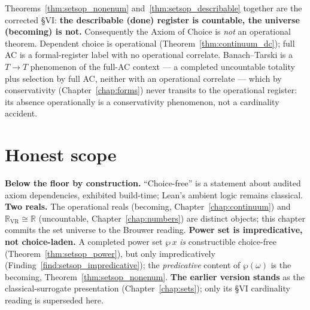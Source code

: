 Theorems~\ref{thm:setsop_nonenum} and~\ref{thm:setsop_describable} together are
the corrected \S VI: \textbf{the describable (done) register is countable, the
universe (becoming) is not.}  Consequently the Axiom of Choice is \emph{not} an
operational theorem.  Dependent choice is operational
(Theorem~\ref{thm:continuum_dc}); full AC is a formal-register label with no
operational correlate.  Banach--Tarski is a $T\!\to\!T$ phenomenon of the
full-AC context --- a completed uncountable totality plus selection by full AC,
neither with an operational correlate --- which by conservativity
(Chapter~\ref{chap:forms}) never transits to the operational register: its
absence operationally is a conservativity phenomenon, not a cardinality accident.

\section{Honest scope}
\label{sec:setsop_scope}

\textbf{Below the floor by construction.}  ``Choice-free'' is a statement about
audited axiom dependencies, exhibited build-time; Lean's ambient logic remains
classical.  \textbf{Two reals.}  The operational reals (becoming,
Chapter~\ref{chap:continuum}) and $\mathbb{R}_{\mathrm{VR}}\cong\mathbb{R}$
(uncountable, Chapter~\ref{chap:numbers}) are distinct objects; this chapter
commits the set universe to the Brouwer reading.  \textbf{Power set is
impredicative, not choice-laden.}  A completed power set $\wp\,x$ \emph{is}
constructible choice-free (Theorem~\ref{thm:setsop_power}), but only
impredicatively (Finding~\ref{find:setsop_impredicative}); the \emph{predicative}
content of $\wp(\omega)$ is the becoming, Theorem~\ref{thm:setsop_nonenum}.
\textbf{The earlier version stands} as the classical-surrogate presentation
(Chapter~\ref{chap:sets}); only its \S VI cardinality reading is superseded here.
